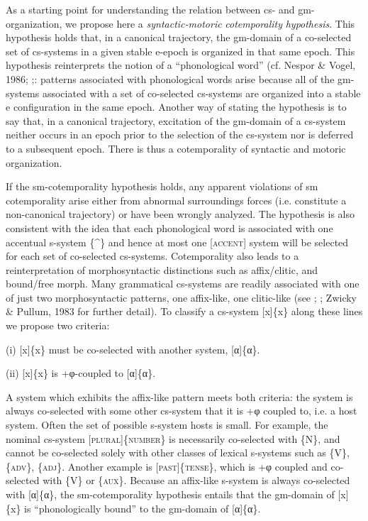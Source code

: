 As a starting point for understanding the relation between cs- and gm-organization, we propose here a \textit{syntactic-motoric} \textit{cotemporality} \textit{hypothesis}. This hypothesis holds that, in a canonical trajectory, the gm-domain of a co-selected set of cs-systems in a given stable e-epoch is organized in that same epoch. This hypothesis reinterprets the notion of a “phonological word” (cf. Nespor \& Vogel, 1986; \citealt{Selkirk1984,Selkirk2011};: patterns associated with phonological words arise because all of the gm-systems associated with a set of co-selected cs-systems are organized into a stable e configuration in the same epoch. Another way of stating the hypothesis is to say that, in a canonical trajectory, excitation of the gm-domain of a cs-system neither occurs in an epoch prior to the selection of the cs-system nor is deferred to a subsequent epoch. There is thus a cotemporality of syntactic and motoric organization. 

  If the sm-cotemporality hypothesis holds, any apparent violations of sm cotemporality arise either from abnormal surroundings forces (i.e. constitute a non-canonical trajectory) or have been wrongly analyzed. The hypothesis is also consistent with the idea that each phonological word is associated with one accentual s-system \{\^{}\} and hence at most one [\textsc{accent}] system will be selected for each set of co-selected cs-systems. Cotemporality also leads to a reinterpretation of morphosyntactic distinctions such as affix/clitic, and bound/free morph. Many grammatical cs-systems are readily associated with one of just two morphosyntactic patterns, one affix-like, one clitic-like (see \citealt{Payne1997}; \citealt{Zwicky1985}; Zwicky \& Pullum, 1983 for further detail). To classify a cs-system [x]\{x\} along these lines we propose two criteria:

    (i)   [x]\{x\} must be co-selected with another system, [α]\{α\}.

    (ii)   [x]\{x\} is +φ-coupled to [α]\{α\}.

  A system which exhibits the affix-like pattern meets both criteria: the system is always co-selected with some other cs-system that it is +φ coupled to, i.e. a host system. Often the set of possible s-system hosts is small. For example, the nominal cs-system [\textsc{plural}]\{\textsc{number}\} is necessarily co-selected with \{N\}, and cannot be co-selected solely with other classes of lexical s-systems such as \{V\}, \{\textsc{adv}\}, \{\textsc{adj}\}. Another example is [\textsc{past}]\{\textsc{tense}\}, which is +φ coupled and co-selected with \{V\} or \{\textsc{aux}\}. Because an affix-like s-system is always co-selected with [α]\{α\}, the sm-cotemporality hypothesis entails that the gm-domain of [x]\{x\} is “phonologically bound” to the gm-domain of [α]\{α\}. 

